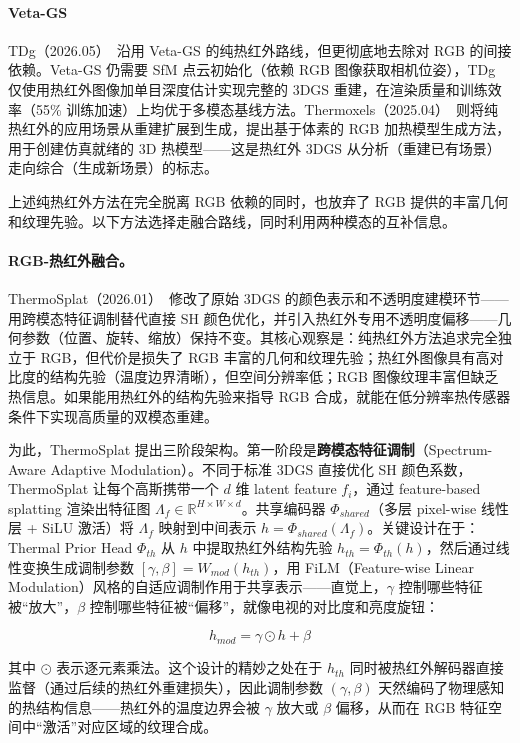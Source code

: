 \paragraph{Veta-GS}
TDg（2026.05）~\cite{2605_30328}沿用 Veta-GS 的纯热红外路线，但更彻底地去除对 RGB 的间接依赖。Veta-GS 仍需要 SfM 点云初始化（依赖 RGB 图像获取相机位姿），TDg 仅使用热红外图像加单目深度估计实现完整的 3DGS 重建，在渲染质量和训练效率（55\% 训练加速）上均优于多模态基线方法。Thermoxels（2025.04）~\cite{2504_04448}则将纯热红外的应用场景从重建扩展到生成，提出基于体素的 RGB 加热模型生成方法，用于创建仿真就绪的 3D 热模型——这是热红外 3DGS 从分析（重建已有场景）走向综合（生成新场景）的标志。

上述纯热红外方法在完全脱离 RGB 依赖的同时，也放弃了 RGB 提供的丰富几何和纹理先验。以下方法选择走融合路线，同时利用两种模态的互补信息。

\paragraph{RGB-热红外融合。} ThermoSplat（2026.01）~\cite{2601_15897}修改了原始 3DGS 的颜色表示和不透明度建模环节——用跨模态特征调制替代直接 SH 颜色优化，并引入热红外专用不透明度偏移——几何参数（位置、旋转、缩放）保持不变。其核心观察是：纯热红外方法追求完全独立于 RGB，但代价是损失了 RGB 丰富的几何和纹理先验；热红外图像具有高对比度的结构先验（温度边界清晰），但空间分辨率低；RGB 图像纹理丰富但缺乏热信息。如果能用热红外的结构先验来指导 RGB 合成，就能在低分辨率热传感器条件下实现高质量的双模态重建。

为此，ThermoSplat 提出三阶段架构。第一阶段是\textbf{跨模态特征调制}（Spectrum-Aware Adaptive Modulation）。不同于标准 3DGS 直接优化 SH 颜色系数，ThermoSplat 让每个高斯携带一个 $d$ 维 latent feature $f_i$，通过 feature-based splatting 渲染出特征图 $\Lambda_f \in \mathbb{R}^{H \times W \times d}$。共享编码器 $\Phi_{shared}$（多层 pixel-wise 线性层 + SiLU 激活）将 $\Lambda_f$ 映射到中间表示 $h = \Phi_{shared}(\Lambda_f)$。关键设计在于：Thermal Prior Head $\Phi_{th}$ 从 $h$ 中提取热红外结构先验 $h_{th} = \Phi_{th}(h)$，然后通过线性变换生成调制参数 $[\gamma, \beta] = W_{mod}(h_{th})$，用 FiLM（Feature-wise Linear Modulation）风格的自适应调制作用于共享表示——直觉上，$\gamma$ 控制哪些特征被“放大”，$\beta$ 控制哪些特征被“偏移”，就像电视的对比度和亮度旋钮：

\begin{equation}
h_{mod} = \gamma \odot h + \beta
\end{equation}

其中 $\odot$ 表示逐元素乘法。这个设计的精妙之处在于 $h_{th}$ 同时被热红外解码器直接监督（通过后续的热红外重建损失），因此调制参数 $(\gamma, \beta)$ 天然编码了物理感知的热结构信息——热红外的温度边界会被 $\gamma$ 放大或 $\beta$ 偏移，从而在 RGB 特征空间中“激活”对应区域的纹理合成。

